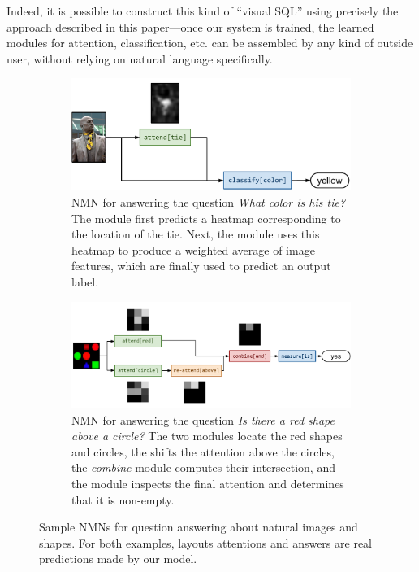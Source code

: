Indeed, it is possible to construct this kind of ``visual SQL'' using precisely
the approach described in this paper---once our system is trained, the learned
modules for attention, classification, etc. can be assembled by any kind of
outside user, without relying on natural language specifically.

\begin{figure}
  \begin{subfigure}[t]{0.4\textwidth}
    \includegraphics[width=\textwidth]{fig/full1}
    \caption{NMN for answering the question \emph{What color is
    his tie?} The  module first predicts a heatmap
    corresponding to the location of the tie. Next, the 
    module uses this heatmap to produce a weighted average of image features,
  which are finally used to predict an output label.}
  \end{subfigure}
  \hfill
  \begin{subfigure}[t]{0.55\textwidth}
    \includegraphics[width=\textwidth]{fig/full2}
    \caption{NMN for answering the question \emph{Is there a red shape above a
    circle?} The two  modules locate the red shapes and circles,
    the  shifts the attention above the circles, the
    \emph{combine} module computes their intersection, and the
     module inspects the final attention and determines
  that it is non-empty.}
  \end{subfigure}
  \caption{Sample NMNs for question answering about natural images and shapes.
  For both examples, layouts attentions and answers are real predictions made by
  our model.}
\end{figure}

